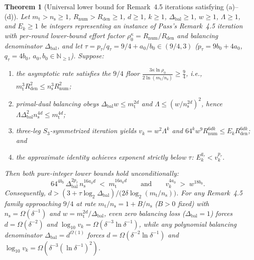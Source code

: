 \documentclass[11pt,a4paper]{article}
\theoremstyle{plain}
\newtheorem{theorem}{Theorem}[section]
\theoremstyle{definition}
\theoremstyle{remark}
\newcommand{\N}{\mathbb{N}}
\begin{document}
\begin{theorem}[Universal lower bound for Remark~4.5 iterations satisfying (a)--(d)]
\label{thm:remark45_universal}
Let $m_{\mathrm{t}} > n_{\mathrm{s}} \ge 1$, $R_{\mathrm{num}} > R_{\mathrm{den}} \ge 1$, $d \ge 1$, $k \ge 1$, $\Delta_{\mathrm{bal}} \ge 1$, $w \ge 1$, $\Lambda \ge 1$, and $E_k \ge 1$ be integers representing an instance of Pass's Remark~4.5 iteration with per-round lower-bound effort factor $\rho_0^\kappa = R_{\mathrm{num}}/R_{\mathrm{den}}$ and balancing denominator $\Delta_{\mathrm{bal}}$, and let $\tau = p_\tau / q_\tau = 9/4 + a_0/b_0 \in (9/4, 3)$ ($p_\tau = 9 b_0 + 4 a_0$, $q_\tau = 4 b_0$, $a_0, b_0 \in \N_{\ge 1}$). Suppose:
\begin{enumerate}[label=(\alph*)]
\item the asymptotic rate satisfies the $9/4$ floor $\frac{3\kappa\ln\rho_0}{2\ln(m_{\mathrm{t}}/n_{\mathrm{s}})} \ge \frac{9}{4}$, i.e., $m_{\mathrm{t}}^3 R_{\mathrm{den}}^2 \le n_{\mathrm{s}}^3 R_{\mathrm{num}}^2$;
\item primal-dual balancing obeys $\Delta_{\mathrm{bal}} w \le m_{\mathrm{t}}^{2d}$ and $\Lambda \le (w / n_{\mathrm{s}}^{2d})^2$, hence $\Lambda \Delta_{\mathrm{bal}}^2 n_{\mathrm{s}}^{4d} \le m_{\mathrm{t}}^{4d}$;
\item three-leg $S_3$-symmetrized iteration yields $v_k = w^2 \Lambda^k$ and $64^k w^9 R_{\mathrm{num}}^{6 d k} \le E_k R_{\mathrm{den}}^{6 d k}$; and
\item the approximate identity achieves exponent strictly below $\tau$: $E_k^{q_\tau} < v_k^{p_\tau}$.
\end{enumerate}
Then both pure-integer lower bounds hold unconditionally:
\begin{equation}
    64^{4 b_0}\,\Delta_{\mathrm{bal}}^{2 p_\tau}\,n_{\mathrm{s}}^{16 a_0 d} \;<\; m_{\mathrm{t}}^{16 a_0 d} \qquad\text{and}\qquad v_k^{4 a_0} \;>\; w^{18 b_0} .
    \label{eq:remark45_universal}
\end{equation}
Consequently, $d > (3 + \tau\log_2 \Delta_{\mathrm{bal}}) / \bigl(2\delta\log_2(m_{\mathrm{t}}/n_{\mathrm{s}})\bigr)$. For any Remark~4.5 family approaching $9/4$ at rate $m_{\mathrm{t}}/n_{\mathrm{s}} = 1 + B/n_{\mathrm{s}}$ ($B > 0$ fixed) with $n_{\mathrm{s}} = \Omega(\delta^{-1})$ and $w = m_{\mathrm{t}}^{2d}/\Delta_{\mathrm{bal}}$, even zero balancing loss ($\Delta_{\mathrm{bal}} = 1$) forces $d = \Omega(\delta^{-2})$ and $\log_{10} v_k = \Omega(\delta^{-3}\ln\delta^{-1})$, while any polynomial balancing denominator $\Delta_{\mathrm{bal}} = d^{\Omega(1)}$ forces $d = \Omega(\delta^{-2}\ln\delta^{-1})$ and $\log_{10} v_k = \Omega(\delta^{-3}(\ln\delta^{-1})^2)$.
\end{theorem}
\end{document}
